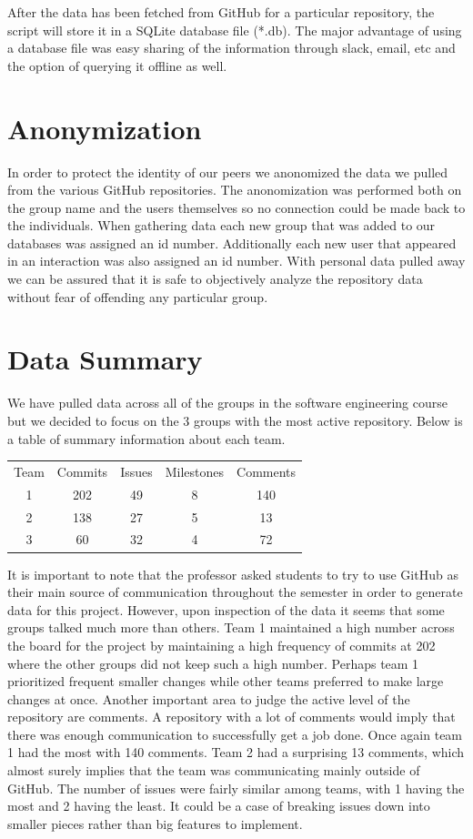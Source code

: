 \documentclass[conference]{IEEEtran}
\begin{document}
After the data has been fetched from GitHub for a particular repository, the script will store it in a SQLite database file (*.db). The major advantage of using a database file was easy sharing of the information through slack, email, etc and the option of querying it offline as well.


\section{Anonymization}
In order to protect the identity of our peers we anonomized  the data we pulled from the various GitHub repositories. The anonomization was performed both on the group name and the users themselves so no connection could be made back to the individuals. When gathering data each new group that was added to our databases was assigned an id number. Additionally each new user that appeared in an interaction was also assigned an id number. With personal data pulled away we can be assured that it is safe to objectively analyze the repository data without fear of offending any particular group. 

\section{Data Summary}
We have pulled data across all of the groups in the software engineering course but we decided to focus on the 3 groups with the most active repository. Below is a table of summary information about each team. 


\begin{tabular}{c|c|c|c|c}
    Team & Commits &  Issues & Milestones & Comments \\
    1 & 202 & 49 & 8 & 140 \\
    2 & 138 & 27 & 5 & 13 \\
    3 & 60 & 32 & 4 & 72 \\
\end{tabular}

It is important to note that the professor asked students to try to use GitHub as their main source of communication throughout the semester in order to generate data for this project. However, upon inspection of the data it seems that some groups talked much more than others. Team 1 maintained a high number across the board for the project by maintaining a high frequency of commits at 202 where the other groups did not keep such a high number. Perhaps team 1 prioritized frequent smaller changes while other teams preferred to make large changes at once. Another important area to judge the active level of the repository are comments. A repository with a lot of comments would imply that there was enough communication to successfully get a job done. Once again team 1 had the most with 140 comments. Team 2 had a surprising 13 comments, which almost surely implies that the team was communicating mainly outside of GitHub. The number of issues were fairly similar among teams, with 1 having the most and 2 having the least. It could be a case of breaking issues down into smaller pieces rather than big features to implement. 
\end{document}
